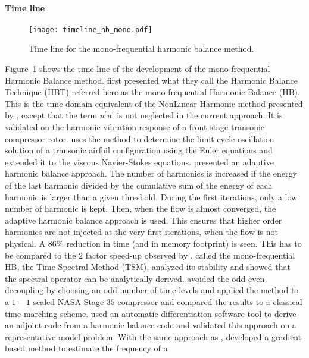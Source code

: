 \paragraph{Time line}
\begin{figure}[htbp]
  \centering
  \texttt{[image: timeline\_hb\_mono.pdf]}
  \caption{Time line for the mono-frequential harmonic balance method.}
  \label{fig:timeline_hb_mono}
\end{figure}
Figure~\ref{fig:timeline_hb_mono} shows the time line of the
development of the mono-frequential Harmonic Balance method.
\citet{Hall2002} first presented what they call
the Harmonic Balance Technique (HBT) referred here
as the mono-frequential Harmonic Balance (HB). This is 
the time-domain equivalent of the NonLinear Harmonic method
presented by \citet{He1998}, except that the term
$u^\prime u^\prime$ is not neglected in the
current approach. It is validated on 
the harmonic vibration response of a front 
stage transonic compressor rotor.
\citet{Thomas2002a} uses the method to
determine the limit-cycle oscillation solution
of a transonic airfoil configuration using the
Euler equations and \citet{Thomas2004b} extended
it to the viscous Navier-Stokes equations.
\citet{Maple2004} presented an adaptive harmonic
balance approach. The number of harmonics is increased
if the energy of the last harmonic divided by the cumulative
sum of the energy of each harmonic is larger than a 
given threshold. During the first iterations, only
a low number of harmonic is kept. Then, when the flow
is almost converged, the adaptive harmonic balance
approach is used. This ensures that higher order harmonics
are not injected at the very first iterations, when the
flow is not physical. A $86\%$ reduction in time (and
in memory footprint) is seen. This has to be compared to
the $2$ factor speed-up observed by \citet{Mosahebi2013}.
\citet{Gopinath2005} called the mono-frequential HB,
the Time Spectral Method (TSM), analyzed its stability and
showed that the spectral operator can be analytically derived.
\citet{Weide2005} avoided the odd-even decoupling by choosing 
an odd number of time-levels
and applied the method to a $1-1$ scaled NASA Stage $35$ compressor 
and
compared the results to a classical time-marching scheme.
\citet{Thomas2005b} used an automatic 
differentiation software tool to derive an adjoint code
from a harmonic balance code and validated this approach
on a representative model problem.
With the same approach as \citet{McMullen2002}, \citet{Gopinath2006}
developed a gradient-based method to estimate the frequency of a 
